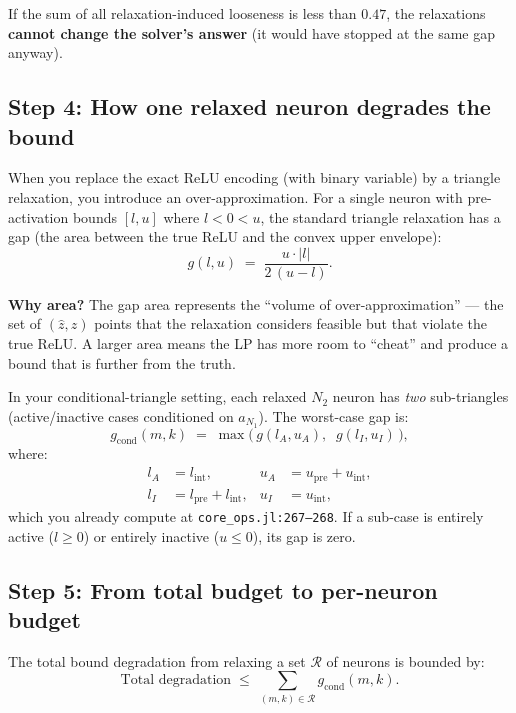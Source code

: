 \documentclass[11pt,a4paper]{article}
\begin{document}
If the sum of all relaxation-induced looseness is less than $0.47$, the
relaxations \textbf{cannot change the solver's answer} (it would have stopped
at the same gap anyway).

\subsection{Step 4: How one relaxed neuron degrades the bound}\label{sec:m7:one}

When you replace the exact ReLU encoding (with binary variable) by a triangle
relaxation, you introduce an over-approximation.  For a single neuron with
pre-activation bounds $[l, u]$ where $l < 0 < u$, the standard triangle
relaxation has a gap (the area between the true ReLU and the convex upper
envelope):
\begin{equation}\label{eq:gap-reminder}
  g(l, u) \;=\; \frac{u \cdot |l|}{2\,(u - l)}.
\end{equation}

\textbf{Why area?}  The gap area represents the ``volume of over-approximation''
--- the set of $(\hat z, z)$ points that the relaxation considers feasible but
that violate the true ReLU.  A larger area means the LP has more room to
``cheat'' and produce a bound that is further from the truth.

In your conditional-triangle setting, each relaxed $N_2$ neuron has \emph{two}
sub-triangles (active/inactive cases conditioned on $a_{N_1}$).  The
worst-case gap is:
\begin{equation}\label{eq:condgap-m7}
  g_{\mathrm{cond}}(m,k)
  \;=\;
  \max\!\bigl(\,g(l_A, u_A),\;\; g(l_I, u_I)\,\bigr),
\end{equation}
where:
\begin{align}
  l_A &= l_{\mathrm{int}},          & u_A &= u_{\mathrm{pre}} + u_{\mathrm{int}},
  \label{eq:active-bounds}\\
  l_I &= l_{\mathrm{pre}} + l_{\mathrm{int}}, & u_I &= u_{\mathrm{int}},
  \label{eq:inactive-bounds}
\end{align}
which you already compute at \texttt{core\_ops.jl:267--268}.  If a sub-case is
entirely active ($l \ge 0$) or entirely inactive ($u \le 0$), its gap is zero.

\subsection{Step 5: From total budget to per-neuron budget}\label{sec:m7:per}

The total bound degradation from relaxing a set $\mathcal{R}$ of neurons is
bounded by:
\begin{equation}\label{eq:sumgap}
  \text{Total degradation}
  \;\le\;
  \sum_{(m,k) \in \mathcal{R}} g_{\mathrm{cond}}(m,k).
\end{equation}
\end{document}
